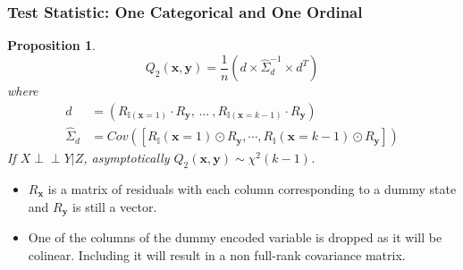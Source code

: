 \documentclass{beamer}
\def\ci{\perp\!\!\!\!\!\perp}
\newtheorem{proposition}{Proposition}
\begin{document}
\begin{frame}
	\frametitle{Test Statistic: One Categorical and One Ordinal}
	\begin{proposition}

		$$ Q_2(\bm{x}, \bm{y}) = \frac{1}{n} (d \times \hat{\Sigma}_d^{-1} \times d^T) $$
	where
	\begin{equation*}
		\begin{split}
		d &= (R_{\mathbb{I}(\mathbf{x}=1)} \cdot R_{\mathbf{y}}, \, \ldots \ , R_{\mathbb{I}(\mathbf{x}=k-1)} \cdot R_{\mathbf{y}}) \\ 
		\hat{\Sigma}_d &= Cov([R_\mathbb{I}(\mathbf{x}=1) \odot R_\mathbf{y}, \cdots, R_\mathbb{I}(\mathbf{x}=k-1) \odot R_\mathbf{y}])
		\end{split}
	\end{equation*}
		If $ X \ci Y | Z $, asymptotically $ Q_2(\bm{x}, \bm{y}) \sim \chi^2(k-1) $.
	\end{proposition}
	\begin{center}
		\begin{itemize}
			\item $ R_{\bm{x}} $ is a matrix of residuals with each column corresponding to a dummy state and $ R_{\bm{y}} $ is still a vector.
			\item One of the columns of the dummy encoded variable
				is dropped as it will be colinear. Including it will
				result in a non full-rank covariance matrix.
		\end{itemize}
	\end{center}
\end{frame}
\end{document}
